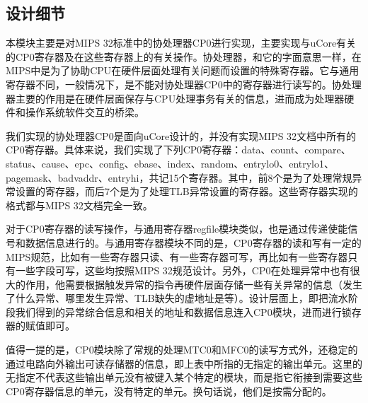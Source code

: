     \subsection{设计细节}
    本模块主要是对MIPS 32标准中的协处理器CP0进行实现，主要实现与uCore有关的CP0寄存器及在这些寄存器上的有关操作。协处理器，和它的字面意思一样，在MIPS中是为了协助CPU在硬件层面处理有关问题而设置的特殊寄存器。它与通用寄存器不同，一般情况下，是不能对协处理器CP0中的寄存器进行读写的。协处理器主要的作用是在硬件层面保存与CPU处理事务有关的信息，进而成为处理器硬件和操作系统软件交互的桥梁。

    我们实现的协处理器CP0是面向uCore设计的，并没有实现MIPS 32文档中所有的CP0寄存器。具体来说，我们实现了下列CP0寄存器：data、count、compare、status、cause、epc、config、ebase、index、random、entrylo0、entrylo1、pagemask、badvaddr、entryhi，共记15个寄存器。其中，前8个是为了处理常规异常设置的寄存器，而后7个是为了处理TLB异常设置的寄存器。这些寄存器实现的格式都与MIPS 32文档完全一致。

    对于CP0寄存器的读写操作，与通用寄存器regfile模块类似，也是通过传递使能信号和数据信息进行的。与通用寄存器模块不同的是，CP0寄存器的读和写有一定的MIPS规范，比如有一些寄存器只读、有一些寄存器可写，再比如有一些寄存器只有一些字段可写，这些均按照MIPS 32规范设计。另外，CP0在处理异常中也有很大的作用，他需要根据触发异常的指令再硬件层面存储一些有关异常的信息（发生了什么异常、哪里发生异常、TLB缺失的虚地址是等）。设计层面上，即把流水阶段我们得到的异常综合信息和相关的地址和数据信息连入CP0模块，进而进行锁存器的赋值即可。

    值得一提的是，CP0模块除了常规的处理MTC0和MFC0的读写方式外，还稳定的通过电路向外输出可读存储器的信息，即上表中所指的无指定的输出单元。这里的无指定不代表这些输出单元没有被键入某个特定的模块，而是指它衔接到需要这些CP0寄存器信息的单元，没有特定的单元。换句话说，他们是按需分配的。
